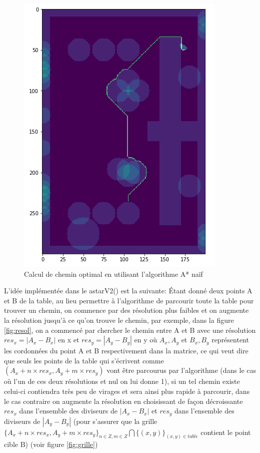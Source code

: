 \documentclass{article}
\begin{document}
\begin{figure}[!h]
\centering
\includegraphics[scale=0.6]{astarV1}
\caption{Calcul de chemin optimal en utilisant l'algorithme A* naïf}
\label{fig:astarV1}
\end{figure}

L'idée implémentée dans le astarV2() est la suivante:
Étant donné deux points A et B de la table, au lieu permettre à l'algorithme de parcourir toute la table pour trouver un chemin, on commence par des résolution plus faibles et on augmente la résolution jusqu'à ce qu'on trouve le chemin, par exemple, dans la figure \ref{fig:resol}, on a commencé par chercher le chemin entre A et B avec une résolution $res_{x} = |A_{x}-B_{x}|$ en x et $res_{y} = |A_{y}-B_{y}|$ en y où $A_{x}, A_{y}$ et $B_{x}, B_{y}$ représentent les cordonnées du point A et B respectivement dans la matrice, ce qui veut dire que seuls les points de la table qui s'écrivent comme $(A_{x} + n \times res_{x}, A_{y} + m \times res_{y})$ vont être parcourus par l'algorithme (dans le cas où l'un de ces deux résolutions et nul on lui donne 1), si un tel chemin existe celui-ci contiendra très peu de virages et sera ainsi plus rapide à parcourir, dans le cas contraire on augmente la résolution en choisissant de façon décroissante $res_{x}$ dans l'ensemble des diviseurs de $|A_{x}-B_{x}|$ et $res_{y}$ dans l'ensemble des diviseurs de $|A_{y}-B_{y}|$ (pour s'assurer que la grille $\{A_{x} + n \times res_{x}, A_{y} + m \times res_{y}\}_{n \in Z, m \in Z} \bigcap \{(x, y)\}_{(x,y) \in table}$ contient le point cible B) (voir figure \ref{fig:grille})
\end{document}
